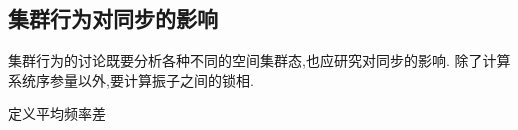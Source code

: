 \documentclass{article}
\begin{document}







\newpage
\subsection{集群行为对同步的影响}

集群行为的讨论既要分析各种不同的空间集群态,也应研究对同步的影响. 除了计算系统序参量以外,要计算振子之间的锁相.

定义平均频率差
\end{document}
